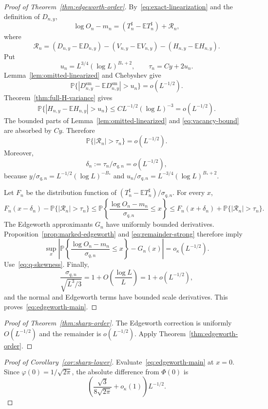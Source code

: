 \documentclass[11pt]{article}
\theoremstyle{remark}
\newcommand{\Pp}{\mathbb P}
\newcommand{\Ee}{\mathbb E}
\begin{document}
\begin{proof}[Proof of Theorem~\ref{thm:edgeworth-order}]
By~\eqref{eq:exact-linearization} and the definition of $D_{n,y}$,
\[
 \log O_n-m_n
 =(T_n^\sharp-\Ee T_n^\sharp)+\mathcal R_n,
\]
where
\[
 \mathcal R_n=(D_{n,y}-\Ee D_{n,y})
 -(V_{n,y}-\Ee V_{n,y})
 -(H_{n,y}-\Ee H_{n,y}).
\]
Put
\[
 u_n=L^{3/4}(\log L)^{B_*+2},
 \qquad
 \tau_n=Cy+2u_n.
\]
Lemma~\ref{lem:omitted-linearized} and Chebyshev give
\[
 \Pp\{|D_{n,y}^{\mathrm{sm}}-\Ee D_{n,y}^{\mathrm{sm}}|>u_n\}
 =o(L^{-1/2}).
\]
Theorem~\ref{thm:full-H-variance} gives
\[
 \Pp\{|H_{n,y}-\Ee H_{n,y}|>u_n\}
 \le C L^{-1/2}(\log L)^{-3}=o(L^{-1/2}).
\]
The bounded parts of Lemma~\ref{lem:omitted-linearized} and
\eqref{eq:vacancy-bound} are absorbed by $Cy$.  Therefore
\begin{equation}
\label{eq:remainder-strong}
 \Pp\{|\mathcal R_n|>\tau_n\}=o(L^{-1/2}).
\end{equation}
Moreover,
\[
 \delta_n:=\tau_n/\sigma_{q,n}=o(L^{-1/2}),
\]
because $y/\sigma_{q,n}=L^{-1/2}(\log L)^{-B_*}$ and
$u_n/\sigma_{q,n}=L^{-3/4}(\log L)^{B_*+2}$.

Let $F_n$ be the distribution function of
$(T_n^\sharp-\Ee T_n^\sharp)/\sigma_{q,n}$.  For every $x$,
\[
 F_n(x-\delta_n)-\Pp\{|\mathcal R_n|>\tau_n\}
 \le
 \Pp\left\{\frac{\log O_n-m_n}{\sigma_{q,n}}\le x\right\}
 \le
 F_n(x+\delta_n)+\Pp\{|\mathcal R_n|>\tau_n\}.
\]
The Edgeworth approximants $G_n$ have uniformly bounded derivatives.
Proposition~\ref{prop:marked-edgeworth} and
\eqref{eq:remainder-strong} therefore imply
\[
 \sup_x\left|
 \Pp\left\{\frac{\log O_n-m_n}{\sigma_{q,n}}\le x\right\}-G_n(x)
 \right|=o_\kappa(L^{-1/2}).
\]
Use~\eqref{eq:q-skewness}.  Finally,
\[
 \frac{\sigma_{q,n}}{\sqrt{L^3/3}}
 =1+O\!\left(\frac{\log L}{L}\right)
 =1+o(L^{-1/2}),
\]
and the normal and Edgeworth terms have bounded scale derivatives.  This
proves~\eqref{eq:edgeworth-main}.
\end{proof}

\begin{proof}[Proof of Theorem~\ref{thm:sharp-order}]
The Edgeworth correction is uniformly $O(L^{-1/2})$ and the remainder is
$o(L^{-1/2})$.  Apply Theorem~\ref{thm:edgeworth-order}.
\end{proof}

\begin{proof}[Proof of Corollary~\ref{cor:sharp-lower}]
Evaluate~\eqref{eq:edgeworth-main} at $x=0$.  Since
$\varphi(0)=1/\sqrt{2\pi}$, the absolute difference from $\Phi(0)$ is
\[
 \left(\frac{\sqrt3}{8\sqrt{2\pi}}+o_\kappa(1)\right)L^{-1/2}.
\]
\end{proof}
\end{document}
